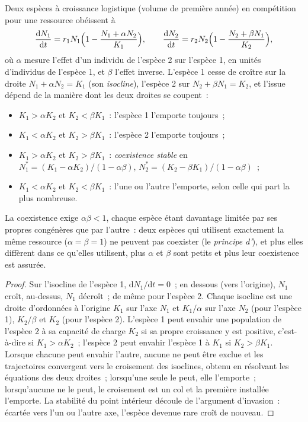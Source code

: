 \begin{theorem}\label{thm:b2:speciation:lv}
Deux espèces à croissance logistique (volume de première année) en
compétition pour une ressource obéissent à
\[
\frac{\mathrm{d}N_1}{\mathrm{d}t} = r_1 N_1\Bigl(1 - \frac{N_1 + \alpha N_2}{K_1}\Bigr), \qquad
\frac{\mathrm{d}N_2}{\mathrm{d}t} = r_2 N_2\Bigl(1 - \frac{N_2 + \beta N_1}{K_2}\Bigr),
\]
où $\alpha$ mesure l'effet d'un individu de l'espèce 2 sur l'espèce 1,
en unités d'individus de l'espèce 1, et $\beta$
l'effet inverse. L'espèce 1 cesse de croître sur la droite $N_1 + \alpha N_2 =
K_1$ (son \emph{isocline}), l'espèce 2 sur $N_2 + \beta N_1 = K_2$, et
l'issue dépend de la manière dont les deux droites se coupent~:
\begin{itemize}
  \item $K_1 > \alpha K_2$ et $K_2 < \beta K_1$~: l'espèce 1 l'emporte
        toujours~;
  \item $K_1 < \alpha K_2$ et $K_2 > \beta K_1$~: l'espèce 2 l'emporte
        toujours~;
  \item $K_1 > \alpha K_2$ et $K_2 > \beta K_1$~: \emph{coexistence
        stable} en $N_1^{*} = (K_1 - \alpha K_2)/(1 - \alpha\beta)$,
        $N_2^{*} = (K_2 - \beta K_1)/(1 - \alpha\beta)$~;
  \item $K_1 < \alpha K_2$ et $K_2 < \beta K_1$~: l'une ou l'autre
        l'emporte, selon celle qui part la plus nombreuse.
\end{itemize}
La coexistence exige $\alpha\beta < 1$, chaque espèce étant davantage
limitée par ses propres congénères que par l'autre~: deux espèces qui
utilisent exactement la même ressource ($\alpha = \beta = 1$) ne peuvent
pas coexister (le \emph{principe d'}), et plus
elles diffèrent dans ce qu'elles utilisent, plus $\alpha$ et $\beta$ sont
petits et plus leur coexistence est assurée.
\end{theorem}
\begin{proof}
Sur l'isocline de l'espèce 1, $\mathrm{d}N_1/\mathrm{d}t = 0$~; en dessous
(vers l'origine), $N_1$ croît, au-dessus, $N_1$ décroît~; de même pour
l'espèce 2. Chaque isocline est une droite d'ordonnées à l'origine $K_1$
sur l'axe $N_1$ et $K_1/\alpha$ sur l'axe $N_2$ (pour l'espèce 1),
$K_2/\beta$ et $K_2$ (pour l'espèce 2). L'espèce 1 peut envahir une
population de l'espèce 2 à sa capacité de charge $K_2$ si sa propre
croissance y est positive, c'est-à-dire si $K_1 > \alpha K_2$~; l'espèce 2
peut envahir l'espèce 1 à $K_1$ si $K_2 > \beta K_1$. Lorsque chacune peut
envahir l'autre, aucune ne peut être exclue et les trajectoires
convergent vers le croisement des isoclines, obtenu en résolvant les
équations des deux droites~; lorsqu'une seule le peut, elle l'emporte~;
lorsqu'aucune ne le peut, le croisement est un col et la première
installée l'emporte. La stabilité du point intérieur découle de
l'argument d'invasion~: écartée vers l'un ou l'autre axe, l'espèce devenue
rare croît de nouveau.
\end{proof}

